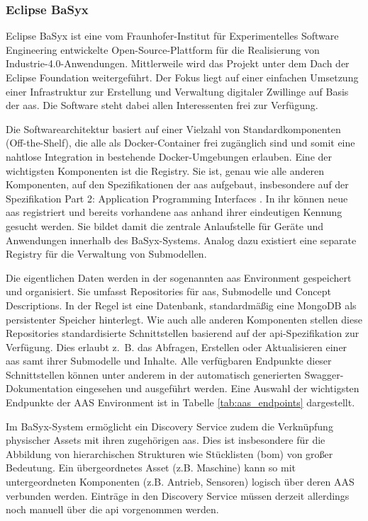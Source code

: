 \subsubsection{Eclipse BaSyx }
Eclipse BaSyx ist eine vom Fraunhofer-Institut für Experimentelles Software Engineering entwickelte Open-Source-Plattform für die Realisierung von Industrie-4.0-Anwendungen.
Mittlerweile wird das Projekt unter dem Dach der Eclipse Foundation weitergeführt.
Der Fokus liegt auf einer einfachen Umsetzung einer Infrastruktur zur Erstellung und Verwaltung digitaler Zwillinge auf Basis der \acs{aas}.
Die Software steht dabei allen Interessenten frei zur Verfügung.

Die Softwarearchitektur basiert auf einer Vielzahl von Standardkomponenten (Off-the-Shelf), die alle als Docker-Container frei zugänglich sind und somit eine nahtlose Integration in bestehende Docker-Umgebungen erlauben.
Eine der wichtigsten Komponenten ist die Registry. 
Sie ist, genau wie alle anderen Komponenten, auf den Spezifikationen der \acs{aas} aufgebaut, insbesondere auf der Spezifikation Part 2: Application Programming Interfaces \cite{SpezifikationPart2}.
In ihr können neue \acs{aas} registriert und bereits vorhandene \acs{aas} anhand ihrer eindeutigen Kennung gesucht werden.
Sie bildet damit die zentrale Anlaufstelle für Geräte und Anwendungen innerhalb des BaSyx-Systems.
Analog dazu existiert eine separate Registry für die Verwaltung von Submodellen.

\newpage
Die eigentlichen Daten werden in der sogenannten \acs{aas} Environment gespeichert und organisiert.
Sie umfasst Repositories für \acs{aas}, Submodelle und Concept Descriptions.
In der Regel ist eine Datenbank, standardmäßig eine MongoDB als persistenter Speicher hinterlegt.
Wie auch alle anderen Komponenten stellen diese Repositories standardisierte Schnittstellen basierend auf der \ac{api}-Spezifikation zur Verfügung.
Dies erlaubt z.~B. das Abfragen, Erstellen oder Aktualisieren einer \acs{aas} samt ihrer Submodelle und Inhalte.
Alle verfügbaren Endpunkte dieser Schnittstellen können unter anderem in der automatisch generierten Swagger-Dokumentation eingesehen und ausgeführt werden. 
Eine Auswahl der wichtigsten Endpunkte der AAS Environment ist in Tabelle \ref{tab:aas_endpoints} dargestellt.


\vspace{-0.5em}

Im BaSyx-System ermöglicht ein Discovery Service zudem die Verknüpfung physischer Assets mit ihren zugehörigen \acs{aas}.
Dies ist insbesondere für die Abbildung von hierarchischen Strukturen wie Stücklisten (\ac{bom}) von großer Bedeutung.
Ein übergeordnetes Asset (z.B. Maschine) kann so mit untergeordneten Komponenten (z.B. Antrieb, Sensoren) logisch über deren AAS verbunden werden.
Einträge in den Discovery Service müssen derzeit allerdings noch manuell über die \acs{api} vorgenommen werden.

